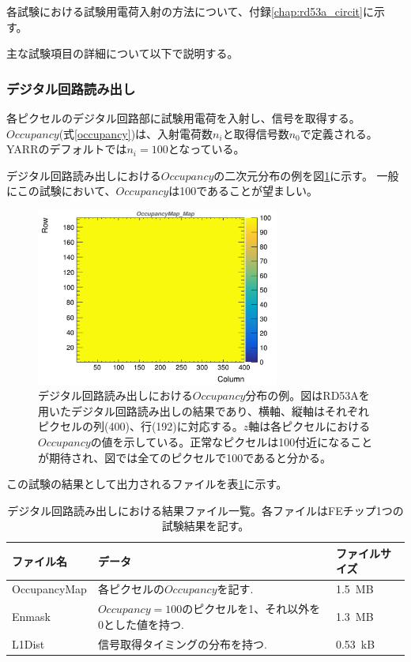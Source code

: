 各試験における試験用電荷入射の方法について、付録\ref{chap:rd53a_circit}に示す。

\clearpage
主な試験項目の詳細について以下で説明する。
\subsubsection{デジタル回路読み出し}
各ピクセルのデジタル回路部に試験用電荷を入射し、信号を取得する。
$Occupancy$(式\ref{occupancy})は、入射電荷数$n_i$と取得信号数$n_0$で定義される。
YARRのデフォルトでは$n_i=100$となっている。

デジタル回路読み出しにおける$Occupancy$の二次元分布の例を図\ref{dig_occ}に示す。
一般にこの試験において、$Occupancy$は100であることが望ましい。

\begin{figure}[bpt]\centering
\includegraphics[width=8cm]{./dig_occ.png}
\caption[デジタル回路読み出しにおける$Occupancy$分布の例]{デジタル回路読み出しにおける$Occupancy$分布の例。図はRD53Aを用いたデジタル回路読み出しの結果であり、横軸、縦軸はそれぞれピクセルの列(400)、行(192)に対応する。$z$軸は各ピクセルにおける$Occupancy$の値を示している。正常なピクセルは100付近になることが期待され、図では全てのピクセルで100であると分かる。}
\label{dig_occ}
\end{figure}

この試験の結果として出力されるファイルを表\ref{digital_result_files}に示す。

\begin{table}[tbp]
\begin{center}
\caption[デジタル回路読み出しにおける結果ファイル一覧]{デジタル回路読み出しにおける結果ファイル一覧。各ファイルはFEチップ1つの試験結果を記す。}
\label{digital_result_files}
  \small
  \begin{tabular}{|lll|} \hline
    ファイル名 & データ & ファイルサイズ \\ \hline
    OccupancyMap & 各ピクセルの$Occupancy$を記す.                           & 1.5~MB \\
    Enmask       & $Occupancy=100$のピクセルを1、それ以外を0とした値を持つ. & 1.3~MB \\ 
    L1Dist       & 信号取得タイミングの分布を持つ. & 0.53~kB \\\hline 
  \end{tabular}
\end{center}
\end{table}

